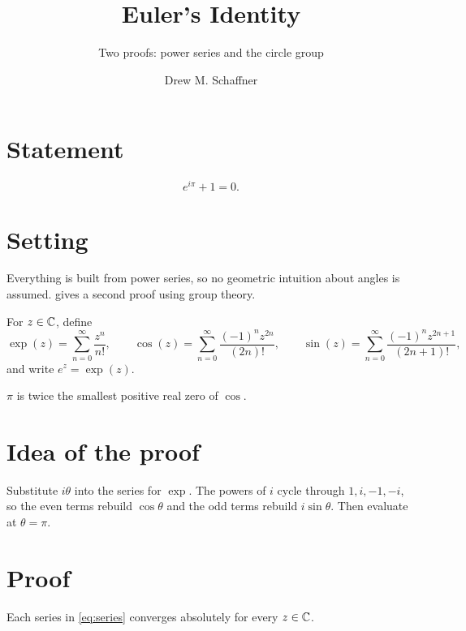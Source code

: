 \documentclass[11pt,a4paper]{article}
\title{Euler's Identity}
\subtitle{Two proofs: power series and the circle group}
\author{Drew M. Schaffner}
\begin{document}
\maketitle

\section{Statement}

\begin{theorem}\label{thm:euler}
  \[
    e^{i\pi} + 1 = 0.
  \]
\end{theorem}

\section{Setting}

Everything is built from power series, so no geometric intuition about angles
is assumed.  gives a second proof using group theory.

\begin{definition}\label{def:exp}
  For $z \in \mathbb{C}$, define
  \begin{equation}\label{eq:series}
    \exp(z) = \sum_{n=0}^{\infty} \frac{z^n}{n!}, \qquad
    \cos(z) = \sum_{n=0}^{\infty} \frac{(-1)^n z^{2n}}{(2n)!}, \qquad
    \sin(z) = \sum_{n=0}^{\infty} \frac{(-1)^n z^{2n+1}}{(2n+1)!},
  \end{equation}
  and write $e^{z} = \exp(z)$.
\end{definition}

\begin{definition}\label{def:pi}
  $\pi$ is twice the smallest positive real zero of $\cos$.
\end{definition}

\section{Idea of the proof}

Substitute $i\theta$ into the series for $\exp$. The powers of $i$ cycle through
$1, i, -1, -i$, so the even terms rebuild $\cos\theta$ and the odd terms rebuild
$i \sin\theta$. Then evaluate at $\theta = \pi$.

\section{Proof}

\begin{lemma}\label{lem:converge}
  Each series in \eqref{eq:series} converges absolutely for every $z \in \mathbb{C}$.
\end{lemma}
\end{document}
